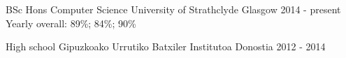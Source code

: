 

\begin{cventries}

  \cventry
    {BSc Hons Computer Science} %
    {University of Strathclyde} %
    {Glasgow} %
    {2014 - present} %
    {Yearly overall: 89\%; 84\%; 90\%}

  \cventry
    {High school} %
    {Gipuzkoako Urrutiko Batxiler Institutoa} %
    {Donostia} %
    {2012 - 2014} %
    {}

\end{cventries}
